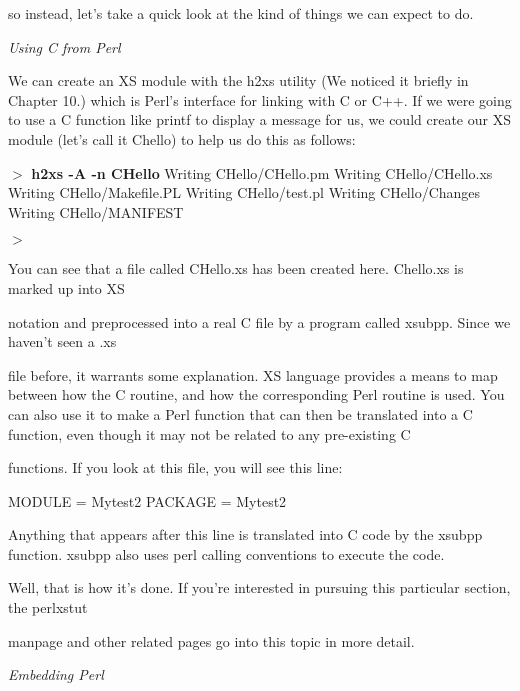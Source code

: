 \documentclass[a4paper,11pt]{book}
\begin{document}
\noindent so instead, let's take a quick look at the kind of things we can expect to do.

\noindent 

\noindent \textit{Using C from Perl}

\noindent We can create an XS module with the h2xs utility (We noticed it briefly in Chapter 10.) which is Perl's interface for linking with C or C++. If we were going to use a C function like printf to display a message for us, we could create our XS module (let's call it Chello) to help us do this as follows:

\noindent 

\noindent $>$ \textbf{h2xs -A -n CHello }Writing CHello/CHello.pm Writing CHello/CHello.xs Writing CHello/Makefile.PL Writing CHello/test.pl Writing CHello/Changes Writing CHello/MANIFEST

\noindent $>$

\noindent 

\noindent 

\noindent You can see that a file called CHello.xs has been created here. Chello.xs is marked up into XS

\noindent notation and preprocessed into a real C file by a program called xsubpp. Since we haven't seen a .xs

\noindent file before, it warrants some explanation. XS language provides a means to map between how the C routine, and how the corresponding Perl routine is used. You can also use it to make a Perl function that can then be translated into a C function, even though it may not be related to any pre-existing C

\noindent functions. If you look at this file, you will see this line:

\noindent 

\noindent MODULE = Mytest2 PACKAGE = Mytest2

\noindent 

\noindent Anything that appears after this line is translated into C code by the xsubpp function. xsubpp also uses perl calling conventions to execute the code.

\noindent 

\noindent Well, that is how it's done. If you're interested in pursuing this particular section, the perlxstut

\noindent manpage and other related pages go into this topic in more detail.

\noindent 

\noindent \textit{Embedding Perl}
\end{document}
